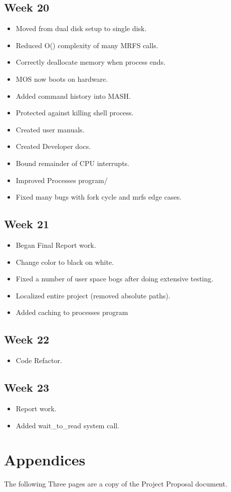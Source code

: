 \documentclass[a4paper]{report}
\begin{document}
\section*{Week 20}
\begin{itemize}
\item Moved from dual disk setup to single disk.
\item Reduced O() complexity of many MRFS calls.
\item Correctly deallocate memory when process ends.
\item MOS now boots on hardware.
\item Added command history into MASH.
\item Protected against killing shell process.
\item Created user manuals.
\item Created Developer docs.
\item Bound remainder of CPU interrupts.
\item Improved Processes program/
\item Fixed many bugs with fork cycle and mrfs edge cases.
\end{itemize}

\section*{Week 21}
\begin{itemize}
\item Began Final Report work.
\item Change color to black on white.
\item Fixed a number of user space bogs after doing extensive testing.
\item Localized entire project (removed absolute paths).
\item Added caching to processes program
\end{itemize}

\section*{Week 22}
\begin{itemize}
\item Code Refactor.
\end{itemize}

\section*{Week 23}
\begin{itemize}
\item Report work.
\item Added wait\_to\_read system call.
\end{itemize}

\chapter{Appendices}

The following Three pages are a copy of the Project Proposal document.








\end{document}
